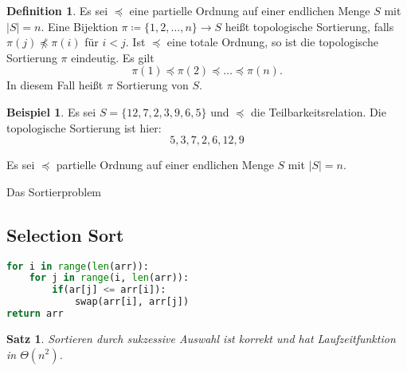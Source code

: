 \documentclass[a4paper,12pt]{article}
\newtheorem{satz}[axiom]{Satz}
\theoremstyle{definition}
\newtheorem*{example}{Beispiel}
\newtheorem{definition}[axiom]{Definition}
\begin{document}
	\begin{definition}
		Es sei $\preceq$ eine partielle Ordnung auf einer endlichen Menge $S$ mit $\lvert S\rvert = n$. Eine Bijektion $\pi \coloneq \{1, 2, \ldots, n\} \to S$ heißt topologische Sortierung, falls $\pi(j) \npreceq \pi(i)$ für $i < j$. Ist $\preceq$ eine totale Ordnung, so ist die topologische Sortierung $\pi$ eindeutig. Es gilt
		\[
			\pi(1) \preceq \pi(2) \preceq \ldots \preceq \pi(n).
		\]
		In diesem Fall heißt $\pi$ Sortierung von $S$.
	\end{definition}
	\begin{example}
		Es sei $S = \{12, 7, 2, 3, 9, 6, 5\}$ und $\preceq$ die Teilbarkeitsrelation. Die topologische Sortierung ist hier:
		\[
			5, 3, 7, 2, 6, 12, 9
		\]
	\end{example}
	Es sei $\preceq$ partielle Ordnung auf einer endlichen Menge $S$ mit $\lvert S\rvert = n$.
	
	\begin{algorithm}[H]
		\caption{Das Sortierproblem}
	\end{algorithm}
	\subsection{Selection Sort}
	\begin{lstlisting}[language=Python]
for i in range(len(arr)):
	for j in range(i, len(arr)):
		if(ar[j] <= arr[i]):
			swap(arr[i], arr[j])
return arr\end{lstlisting}
	\begin{satz}
		Sortieren durch sukzessive Auswahl ist korrekt und hat Laufzeitfunktion in $\Theta(n^2)$.
	\end{satz}
\end{document}
